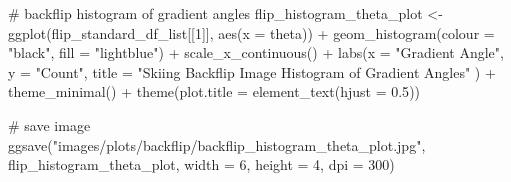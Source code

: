 \documentclass[
  letterpaper,
  DIV=11,
  numbers=noendperiod]{scrreprt}
\newenvironment{Shaded}{\begin{snugshade}}{\end{snugshade}}
\newcommand{\AttributeTok}[1]{\textcolor[rgb]{0.40,0.45,0.13}{#1}}
\newcommand{\CommentTok}[1]{\textcolor[rgb]{0.37,0.37,0.37}{#1}}
\newcommand{\DecValTok}[1]{\textcolor[rgb]{0.68,0.00,0.00}{#1}}
\newcommand{\FloatTok}[1]{\textcolor[rgb]{0.68,0.00,0.00}{#1}}
\newcommand{\FunctionTok}[1]{\textcolor[rgb]{0.28,0.35,0.67}{#1}}
\newcommand{\NormalTok}[1]{\textcolor[rgb]{0.00,0.23,0.31}{#1}}
\newcommand{\OtherTok}[1]{\textcolor[rgb]{0.00,0.23,0.31}{#1}}
\newcommand{\SpecialCharTok}[1]{\textcolor[rgb]{0.37,0.37,0.37}{#1}}
\newcommand{\StringTok}[1]{\textcolor[rgb]{0.13,0.47,0.30}{#1}}
\begin{document}
\begin{Shaded}
\begin{Highlighting}[]
\CommentTok{\# backflip histogram of gradient angles}
\NormalTok{flip\_histogram\_theta\_plot }\OtherTok{\textless{}{-}}
  \FunctionTok{ggplot}\NormalTok{(flip\_standard\_df\_list[[}\DecValTok{1}\NormalTok{]],}
         \FunctionTok{aes}\NormalTok{(}\AttributeTok{x =}\NormalTok{ theta)) }\SpecialCharTok{+}
  \FunctionTok{geom\_histogram}\NormalTok{(}\AttributeTok{colour =} \StringTok{"black"}\NormalTok{, }\AttributeTok{fill =} \StringTok{"lightblue"}\NormalTok{) }\SpecialCharTok{+}
  \FunctionTok{scale\_x\_continuous}\NormalTok{() }\SpecialCharTok{+}
  \FunctionTok{labs}\NormalTok{(}\AttributeTok{x =} \StringTok{"Gradient Angle"}\NormalTok{,}
       \AttributeTok{y =} \StringTok{"Count"}\NormalTok{,}
       \AttributeTok{title =} \StringTok{"Skiing Backflip Image Histogram of Gradient Angles"}
\NormalTok{       ) }\SpecialCharTok{+}
  \FunctionTok{theme\_minimal}\NormalTok{() }\SpecialCharTok{+}
  \FunctionTok{theme}\NormalTok{(}\AttributeTok{plot.title =} \FunctionTok{element\_text}\NormalTok{(}\AttributeTok{hjust =} \FloatTok{0.5}\NormalTok{))}

\CommentTok{\# save image}
\FunctionTok{ggsave}\NormalTok{(}\StringTok{"images/plots/backflip/backflip\_histogram\_theta\_plot.jpg"}\NormalTok{, flip\_histogram\_theta\_plot, }\AttributeTok{width =} \DecValTok{6}\NormalTok{, }\AttributeTok{height =} \DecValTok{4}\NormalTok{, }\AttributeTok{dpi =} \DecValTok{300}\NormalTok{)}
\end{Highlighting}
\end{Shaded}
\end{document}
